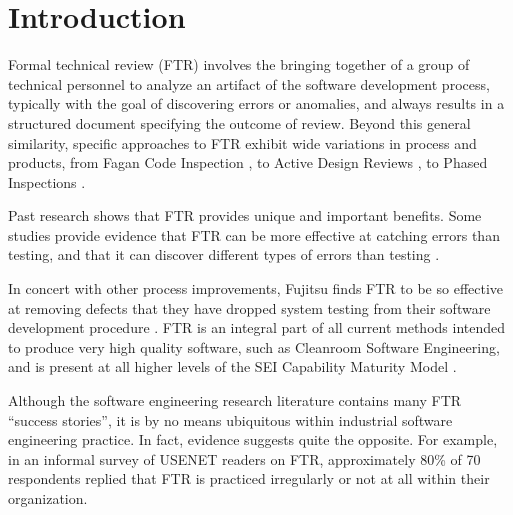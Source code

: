 
\section{Introduction}


Formal technical review (FTR) involves the bringing together of a group of
technical personnel to analyze an artifact of the software development
process, typically with the goal of discovering errors or anomalies, and
always results in a structured document specifying the outcome of review.
Beyond this general similarity, specific approaches to FTR exhibit wide
variations in process and products, from Fagan Code Inspection
\cite{Fagan86}, to Active Design Reviews \cite{Parnas85}, to Phased
Inspections \cite{Knight93}.  

Past research shows that FTR provides unique and important benefits.  Some
studies provide evidence that FTR can be more effective at catching errors
than testing, and that it can discover different types of errors than
testing \cite{Basili85}. 

In concert with other process improvements, Fujitsu finds FTR to be so
effective at removing defects that they have dropped system testing from
their software development procedure \cite{Arthur93}.  FTR is an integral
part of all current methods intended to produce very high quality software,
such as Cleanroom Software Engineering, and is present at all higher levels
of the SEI Capability Maturity Model \cite{Paulk93}.

Although the software engineering research literature contains many FTR
``success stories'', it is by no means ubiquitous within industrial
software engineering practice.  In fact, evidence suggests quite the opposite. For
example, in an informal survey of USENET readers on FTR, approximately 80\%
of 70 respondents replied that FTR is practiced irregularly or not at all
within their organization.

